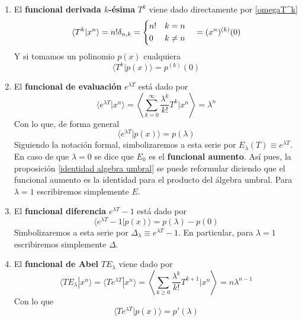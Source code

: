 \begin{ej}
\begin{enumerate}
    \item El \textbf{funcional derivada $k$-ésima} $T^k$ viene dado directamente por \ref{omegaT^k}
    \begin{equation*}
        \langle T^k| x^n \rangle = n!\delta_{n,k} = \begin{dcases}
            n! & k=n\\
            0 & k \neq n
        \end{dcases}
        \quad =  (x^n)^{(k)}(0)
    \end{equation*}
    Y si tomamos un polinomio $p(x)$ cualquiera
    \begin{equation}\label{funcional derivada}
        \langle T^k| p(x) \rangle = p^{(k)}(0)
    \end{equation}
    \item El \textbf{funcional de evaluación} $e^{\lambda T}$ está dado por
    \begin{equation*}
       \langle e^{ \lambda T} | x^n \rangle = \left\langle \sum_{k = 0}^\infty \frac{\lambda^k}{k!}T^k | x^n \right\rangle = \lambda^n 
    \end{equation*}
    Con lo que, de forma general
    \begin{equation}\label{funcional evaluacion}
        \langle e^{\lambda T} | p(x) \rangle = p(\lambda)
    \end{equation}
    Siguiendo la notación formal, simbolizaremos a esta serie por $E_\lambda (T) \equiv e^{\lambda T}$. En caso de que $\lambda = 0$ se dice que $E_0$ es el \textbf{funcional aumento}. Así pues, la proposición \ref{identidad algebra umbral} se puede reformular diciendo que el funcional aumento es la identidad para el producto del álgebra umbral. Para $\lambda = 1$ escribiremos simplemente $E$.
    \item El \textbf{funcional diferencia} $e^{ \lambda T} -1$ está dado por
    \begin{equation}\label{funcional diferencia}
        \langle e^{\lambda T}-1 | p(x) \rangle = p(\lambda)-p(0)
    \end{equation}
    Simbolizaremos a esta serie por $\Delta_\lambda \equiv e^{\lambda T} - 1$. En particular, para $\lambda = 1$ escribiremos simplemente $\Delta$.
    \item El \textbf{funcional de Abel} $T E_\lambda$ viene dado por
    \begin{equation*}
        \langle T E_\lambda | x^n \rangle = \langle Te^{\lambda T} | x^n \rangle = \left\langle \sum_{k\geq0} \frac{\lambda^k}{k!}T^{k+1} | x^n \right\rangle = n\lambda^{n-1}
    \end{equation*}
    Con lo que
    \begin{equation}\label{funcional de abel}
        \langle Te^{\lambda T} | p(x) \rangle = p'(\lambda)
    \end{equation}
\end{enumerate}
\end{ej}


